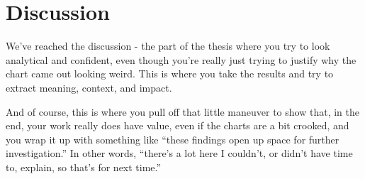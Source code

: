\chapter{Discussion}
\label{chap:discussao}
We've reached the discussion - the part of the thesis where you try to look analytical and confident, even though you're really just trying to justify why the chart came out looking weird. This is where you take the results and try to extract meaning, context, and impact.

And of course, this is where you pull off that little maneuver to show that, in the end, your work really does have value, even if the charts are a bit crooked, and you wrap it up with something like \enquote{these findings open up space for further investigation.} In other words, \enquote{there's a lot here I couldn't, or didn't have time to, explain, so that's for next time.}
